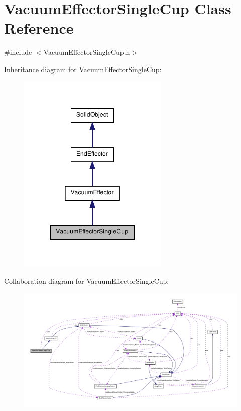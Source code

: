 \hypertarget{class_vacuum_effector_single_cup}{
\section{VacuumEffectorSingleCup Class Reference}
\label{class_vacuum_effector_single_cup}
}


{\ttfamily \#include $<$VacuumEffectorSingleCup.h$>$}



Inheritance diagram for VacuumEffectorSingleCup:\nopagebreak
\begin{figure}[H]
\begin{center}
\leavevmode
\includegraphics[width=204pt]{class_vacuum_effector_single_cup__inherit__graph}
\end{center}
\end{figure}


Collaboration diagram for VacuumEffectorSingleCup:\nopagebreak
\begin{figure}[H]
\begin{center}
\leavevmode
\includegraphics[width=400pt]{class_vacuum_effector_single_cup__coll__graph}
\end{center}
\end{figure}
